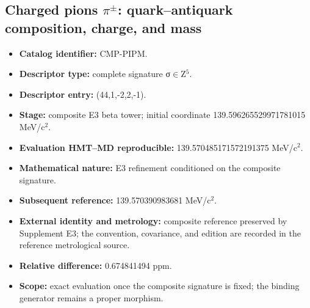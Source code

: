 \subsection{Charged pions \(\pi^\pm\): quark–antiquark composition, charge, and mass}
\begin{itemize}
\item \textbf{Catalog identifier:} CMP-PIPM.
\item \textbf{Descriptor type:} complete signature σ\(\in\)Z\({}^{5}\).
\item \textbf{Descriptor entry:} (44,1,-2,2,-1).
\item \textbf{Stage:} composite E3 beta tower; initial coordinate 139.596265\allowbreak{}529971\allowbreak{}781015 MeV/c\({}^{2}\).
\item \textbf{Evaluation HMT--MD reproducible:} 139.570485\allowbreak{}171572\allowbreak{}191375 MeV/c\({}^{2}\).
\item \textbf{Mathematical nature:} E3 refinement conditioned on the composite signature.
\item \textbf{Subsequent reference:} 139.570390\allowbreak{}983681 MeV/c\({}^{2}\).
\item \textbf{External identity and metrology:} composite reference preserved by Supplement E3; the convention, covariance, and edition are recorded in the reference metrological source.
\item \textbf{Relative difference:} 0.674841\allowbreak{}494 ppm.
\item \textbf{Scope:} exact evaluation once the composite signature is fixed; the binding generator remains a proper morphism.
\end{itemize}
